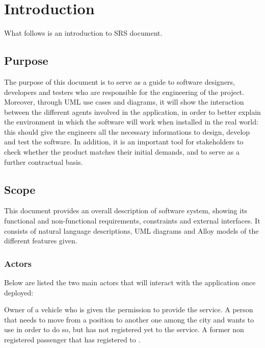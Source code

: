 \section{Introduction}      %
What follows is an introduction to \myTaxiService{} SRS document.
\subsection{Purpose}
The purpose of this document is to serve as a guide to software designers, developers and testers who are responsible for the engineering of the \myTaxiService{} project.
Moreover, through UML use cases and diagrams, it will show the interaction between the different agents involved in the application, in order to better explain the environment in which the software will work when installed in the real world: this should give the engineers all the necessary informations to design, develop and test the software.
In addition, it is an important tool for stakeholders to check whether the product matches their initial demands, and to serve as a further contractual basis.
\subsection{Scope}
This document provides an overall description of \myTaxiService{} software system, showing its functional and non-functional requirements, constraints and external interfaces.
It consists of natural language descriptions, UML diagrams and Alloy models of the different features given.
\subsubsection{Actors}
Below are listed the two main actors that will interact with the application once deployed:
\begin{itemize}
		Owner of a vehicle who is given the permission to provide the service.
	 A person that needs to move from a position to another one among the city and wants to use \myTaxiService{} in order to do so, but has not registered yet to the service.
	 A former non registered passenger that has registered to \myTaxiService{}.
\end{itemize}

